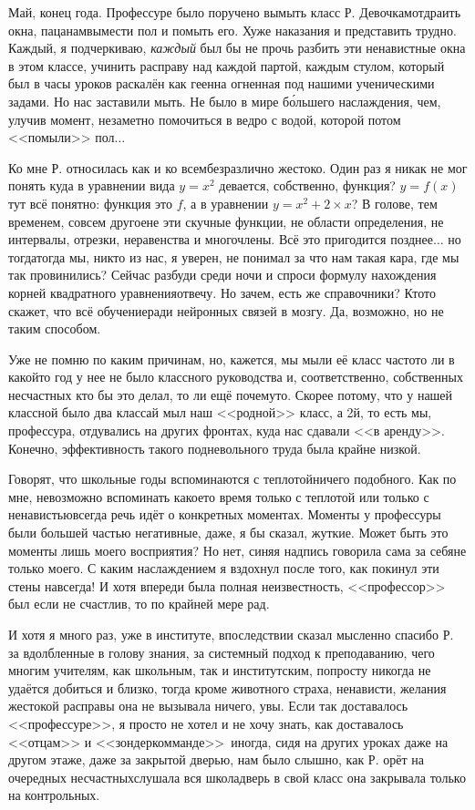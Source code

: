 Май, конец года. Профессуре было поручено вымыть класс Р. Девочкам\mdash отдраить окна, пацанам\mdash вымести пол и помыть его. Хуже наказания и представить трудно. Каждый, я подчеркиваю, \textit{каждый} был бы не прочь разбить эти ненавистные окна в этом классе, учинить расправу над каждой партой, каждым стулом, который был в часы уроков раскалён как геенна огненная под нашими ученическими задами. Но нас заставили мыть. Не было в мире б\'{о}льшего наслаждения, чем, улучив момент, незаметно помочиться в ведро с водой, которой потом <<помыли>> пол$\ldots$

Ко мне Р. относилась как и ко всем\mdash безразлично жестоко. Один раз я никак не мог понять куда в уравнении вида ${y=x^2}$ девается, собственно, функция? ${y=f(x)}$\mdash тут всё понятно: функция это $f$, а в уравнении ${y=x^2 + 2\times x}$? В голове, тем временем, совсем другое\mdash не эти скучные функции, не области определения, не интервалы, отрезки, неравенства и многочлены. Всё это пригодится позднее$\ldots$ но тогда\mdash тогда мы, никто из нас, я уверен, не понимал за что нам такая кара, где мы так провинились? Сейчас разбуди среди ночи и спроси формулу нахождения корней квадратного уравнения\mdash отвечу. Но зачем, есть же справочники? Кто\sdash то скажет, что всё обучение\mdash ради нейронных связей в мозгу. Да, возможно, но не таким способом. 

Уже не помню по каким причинам, но, кажется, мы мыли её класс часто\mdash то ли в какой\sdash то год у нее не было классного руководства и, соответственно, собственных несчастных кто бы это делал, то ли ещё почему\sdash то. Скорее потому, что у нашей классной было два класса\sdash й мыл наш <<родной>> класс, а 2\sdash й, то есть мы, профессура, отдувались на других фронтах, куда нас сдавали <<в аренду>>. Конечно, эффективность такого подневольного труда была крайне низкой. 

Говорят, что школьные годы вспоминаются с теплотой\mdash ничего подобного. Как по мне, невозможно вспоминать какое\sdash то время только с теплотой или только с ненавистью\mdash всегда речь идёт о конкретных моментах. Моменты у профессуры были большей частью негативные, даже, я бы сказал, жуткие. Может быть это моменты лишь моего восприятия? Но нет, синяя надпись говорила сама за себя\mdash не только моего. С каким наслаждением я вздохнул после того, как покинул эти стены навсегда! И хотя впереди была полная неизвестность, <<профессор>> был если не счастлив, то по крайней мере рад. 

И хотя я много раз, уже в институте, впоследствии сказал мысленно спасибо Р. за вдолбленные в голову знания, за системный подход к преподаванию, чего многим учителям, как школьным, так и институтским, попросту никогда не удаётся добиться и близко, тогда кроме животного страха, ненависти, желания жестокой расправы она не вызывала ни\sdash че\sdash го, увы. Если так доставалось <<профессуре>>, я просто не хотел и не хочу знать, как доставалось <<отцам>> и <<зондеркомманде>>~\cite{ГеографГлобусПропил}\mdash иногда, сидя на других уроках даже на другом этаже, даже за закрытой дверью, нам было слышно, как Р. орёт на очередных несчастных\mdash слушала вся школа\mdash дверь в свой класс она закрывала только на контрольных.

